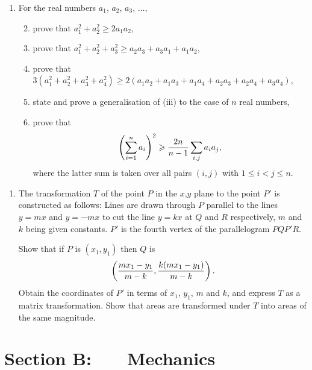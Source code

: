 \documentclass[a4, 11pt]{report}
\newlength{\qspace}
\newcounter{qnumber}
\newenvironment{question}%
 {\vspace{\qspace}
  \begin{enumerate}[\bfseries 1\quad][10]%
    \setcounter{enumi}{\value{qnumber}}%
    \item%
 }
{
  \end{enumerate}
  \filbreak
  \stepcounter{qnumber}
 }
\newenvironment{questionparts}[1][1]%
 {
  \begin{enumerate}[\bfseries (i)]%
    \setcounter{enumii}{#1}
    \addtocounter{enumii}{-1}
    \setlength{\itemsep}{5mm}
    \setlength{\parskip}{8pt}
 }
 {
  \end{enumerate}
 }
\def\le{\leqslant}
\def\ge{\geqslant}
\begin{document}
		
		\begin{question}
For the real numbers $a_1$, $a_2$, $a_3$, $\ldots$,
\begin{questionparts}
\item prove that $a_1^2+a_2^2 \ge 2a_1a_2$,
\item prove that $a_1^2+a_2^2 +a_3^2  \ge a_2a_3 + a_3a_1 +a_1a_2$,
\item prove that $3(a_1^2+a_2^2 +a_3^2 +a_4^2)
 \ge 2(a_1a_2+a_1a_3 + a_1a_4 +a_2a_3 + a_2a_4 +a_3a_4)$,
\item state and prove a generalisation of (iii) to the case of $n$ real
numbers,
\item prove that 
$$
\left(\sum_{i=1}^n a_i \right)^2 \ge {2n\over n-1} \sum_{i,j} a_ia_j,
$$
where the latter sum is taken over all pairs $(i,j)$ with $1\le i<j\le
n$. 
\end{questionparts}
		\end{question}
		
	
\begin{question}
The transformation $T$ of the point $P$ in the $x$,$y$ plane to
the point $P'$ is constructed as follows:
\hfil\break
Lines are drawn through $P$ parallel to the lines $y=mx$ and $y=-mx$
to cut the line $y=kx$ at $Q$ and $R$ respectively, $m$ and $k$ being
given constants. $P'$ is the fourth vertex of the parallelogram
$PQP'R$. 

Show that if $P$ is $(x_1,y_1)$ then $Q$ is 
$$
\left( {mx_1-y_1 \over m-k}, {k(mx_1-y_1)\over m-k}\right).
$$
Obtain the coordinates of $P'$ in terms of 
$x_1$, $y_1$, $m$ and $k$, and express $T$ as a matrix transformation.
Show that  areas are transformed under $T$ into areas of the same 
magnitude.  
\end{question}
			
		
		
		
	
\newpage
\section*{Section B: \ \ \ Mechanics}
\end{document}
